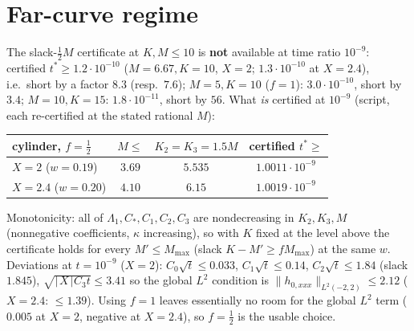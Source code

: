 \documentclass[11pt]{article}
\begin{document}
\section{Far-curve regime}
The slack-$\frac12M$ certificate at $K,M\le10$ is \textbf{not} available at time ratio $10^{-9}$: certified $t^*\ge1.2\cdot10^{-10}$ ($M=6.67,K=10$, $X=2$; $1.3\cdot10^{-10}$ at $X=2.4$), i.e.\ short by a factor $8.3$ (resp.\ $7.6$); $M=5,K=10$ ($f=1$): $3.0\cdot10^{-10}$, short by $3.4$; $M=10,K=15$: $1.8\cdot10^{-11}$, short by $56$. What \emph{is} certified at $10^{-9}$ (script, each re-certified at the stated rational $M$):
\begin{center}\small\begin{tabular}{lccc}\toprule
cylinder, $f=\frac12$ & $M\le$ & $K_2=K_3=1.5M$ & certified $t^*\ge$\\\midrule
$X=2$ ($w=0.19$) & $3.69$ & $5.535$ & $1.0011\cdot10^{-9}$\\
$X=2.4$ ($w=0.20$) & $4.10$ & $6.15$ & $1.0019\cdot10^{-9}$\\\bottomrule
\end{tabular}\end{center}
Monotonicity: all of $\Lambda_1,C_*,C_1,C_2,C_3$ are nondecreasing in $K_2,K_3,M$ (nonnegative coefficients, $\kappa$ increasing), so with $K$ fixed at the level above the certificate holds for every $M'\le M_{\max}$ (slack $K-M'\ge fM_{\max}$) at the same $w$. Deviations at $t=10^{-9}$ ($X=2$): $C_0\sqrt t\le0.033$, $C_1\sqrt t\le0.14$, $C_2\sqrt t\le1.84$ (slack $1.845$), $\sqrt{\lceil X\rceil C_3t}\le3.41$ so the global $L^2$ condition is $\|h_{0,xxx}\|_{L^2(-2,2)}\le2.12$ ($X=2.4$: $\le1.39$). Using $f=1$ leaves essentially no room for the global $L^2$ term ($0.005$ at $X=2$, negative at $X=2.4$), so $f=\frac12$ is the usable choice.
\end{document}
